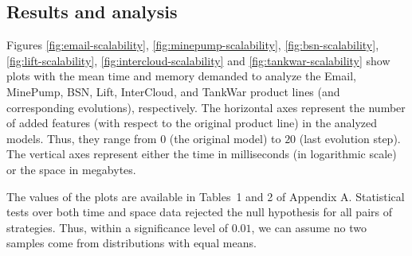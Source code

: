 \subsection{Results and analysis \label{sec:resultsAnalysis}}

Figures \ref{fig:email-scalability}, \ref{fig:minepump-scalability},
\ref{fig:bsn-scalability}, \ref{fig:lift-scalability},
\ref{fig:intercloud-scalability} and \ref{fig:tankwar-scalability} show plots
with the mean time and memory demanded to analyze the Email, MinePump, BSN,
Lift, InterCloud, and TankWar product lines (and corresponding evolutions),
respectively.  The horizontal axes represent the number of added features (with
respect to the original product line) in the analyzed models. Thus, they range
from $0$ (the original model) to $20$ (last evolution step).  The vertical axes
represent either the time in milliseconds (in logarithmic scale) or the space in
megabytes.

The values of the plots are available in Tables~1
and 2 of Appendix A.  Statistical
tests over both time and space data rejected the null hypothesis for all pairs
of strategies.  Thus, within a significance level of $0.01$, we can assume no
two samples come from distributions with equal means.


